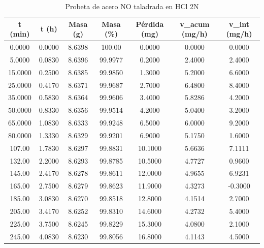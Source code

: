 \documentclass[11pt,a4paper]{article}
\begin{document}
\begin{table}[H]
\centering
\caption{Probeta de acero NO taladrada en HCl 2N}
\label{tab:no_taladrada}
\begin{tabular}{ccccccc}
\toprule
t (min) & t (h) & Masa (g) & Masa (\%) & Pérdida (mg) & v\_acum (mg/h) & v\_int (mg/h) \\
\midrule
0.0000 & 0.0000 & 8.6398 & 100.00 & 0.0000 & 0.0000 & 0.0000 \\
5.0000 & 0.0830 & 8.6396 & 99.9977 & 0.2000 & 2.4000 & 2.4000 \\
15.0000 & 0.2500 & 8.6385 & 99.9850 & 1.3000 & 5.2000 & 6.6000 \\
25.0000 & 0.4170 & 8.6371 & 99.9687 & 2.7000 & 6.4800 & 8.4000 \\
35.0000 & 0.5830 & 8.6364 & 99.9606 & 3.4000 & 5.8286 & 4.2000 \\
50.0000 & 0.8330 & 8.6356 & 99.9514 & 4.2000 & 5.0400 & 3.2000 \\
65.0000 & 1.0830 & 8.6333 & 99.9248 & 6.5000 & 6.0000 & 9.2000 \\
80.0000 & 1.3330 & 8.6329 & 99.9201 & 6.9000 & 5.1750 & 1.6000 \\
107.00 & 1.7830 & 8.6297 & 99.8831 & 10.1000 & 5.6636 & 7.1111 \\
132.00 & 2.2000 & 8.6293 & 99.8785 & 10.5000 & 4.7727 & 0.9600 \\
145.00 & 2.4170 & 8.6278 & 99.8611 & 12.0000 & 4.9655 & 6.9231 \\
165.00 & 2.7500 & 8.6279 & 99.8623 & 11.9000 & 4.3273 & -0.3000 \\
185.00 & 3.0830 & 8.6270 & 99.8518 & 12.8000 & 4.1514 & 2.7000 \\
205.00 & 3.4170 & 8.6252 & 99.8310 & 14.6000 & 4.2732 & 5.4000 \\
225.00 & 3.7500 & 8.6245 & 99.8229 & 15.3000 & 4.0800 & 2.1000 \\
245.00 & 4.0830 & 8.6230 & 99.8056 & 16.8000 & 4.1143 & 4.5000 \\
\bottomrule
\end{tabular}
\end{table}
\end{document}
